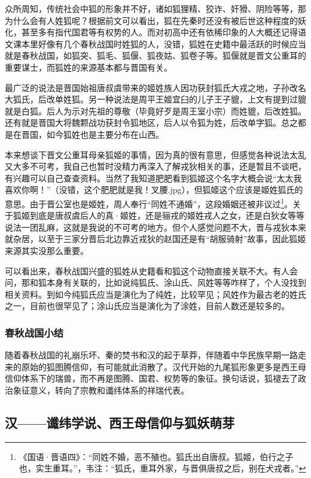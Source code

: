 \documentclass[UTF8, 12pt, A4paper]{article}
\begin{document}
众所周知，传统社会中狐的形象并不好，诸如狐狸精、狡诈、奸猾、阴险等等，那为什么会有人姓狐呢？根据前文可以看出，狐在先秦时还没有被后世这种程度的妖化，甚至多有指代国君等有权势的人。而对初高中还有依稀印象的人大概还记得语文课本里好像有几个春秋战国时姓狐的人，没错，狐姓在史籍中最活跃的时候应当就是春秋战国，如狐突、狐毛、狐偃、狐夜姑、狐卷子等。狐偃就是晋文公重耳的重要谋士，而狐姓的来源基本都与晋国有关。

最广泛的说法是晋国始祖唐叔虞带来的姬姓族人因功获封狐氏大戎之地，子孙改名大狐氏，后改单姓狐。另一种说法是周平王姬宜臼的儿子王子貔，上文有提到过貔就是白狐。后人为示对先祖的尊敬（毕竟好歹是周王室小宗）而姓貔，后改姓狐。还有就是晋国大将魏颗战功获封令狐地区，后人以令狐为姓，后改单字狐。总之都是在晋国，如今狐姓也是主要分布在山西。

本来想谈下晋文公重耳母亲狐姬的事情，因为真的很有意思，但感觉各种说法太乱又大多不可考，我自己也暂时没精力再深入了解戎狄相关的事，还是暂且不谈吧，有兴趣可以自己查查资料。当然了我知道肥肥看到狐姬这个名字大概会说“太太我喜欢你啊！”（没错，这个肥肥就是我！叉腰.jpg），但狐姬这个应该是姬姓狐氏的意思。由于晋公室也是姬姓，周人奉行“同姓不通婚”，这段婚姻还被非议过\footnote{《国语·晋语四》：“同姓不婚，恶不殖也。狐氏出自唐叔。狐姬，伯行之子也，实生重耳。”，韦注：“狐氏，重耳外家，与晋俱唐叔之后，别在犬戎者。”}。关于狐姬到底是唐叔虞后人的真·姬姓，还是骊戎的姬姓戎人之女，还是白狄女等等说法一团乱麻，这就是我说的不可考的地方。但个人感觉问题不大，晋与戎狄本来就杂居，以至于三家分晋后北边靠近戎狄的赵国还是有“胡服骑射”故事，因此狐姬来源其实没那么重要。

可以看出来，春秋战国兴盛的狐姓从史籍看和狐这个动物直接关联不大。有人会问，那和狐本身有关联的，比如说纯狐氏、涂山氏、风姓等等咋样了，个人没找到相关资料。到如今纯狐氏应当是演化为了纯姓，比较罕见；风姓作为最古老的姓氏之一，目前也很罕见了；涂山氏应当是演化为了涂姓，目前人数还是较多的。

\subsubsection{春秋战国小结}

随着春秋战国的礼崩乐坏、秦的焚书和汉的起于草莽，伴随着中华民族早期一路走来的原始的狐图腾信仰，有可能就此消散了。汉代开始的九尾狐形象更多是西王母信仰体系下的瑞兽，而不再是图腾、国君、权势等的象征。换句话说，狐褪去了政治象征意义，转向了宗教和谶纬体系的祥瑞代表。

\subsection{汉——谶纬学说、西王母信仰与狐妖萌芽}
\end{document}
